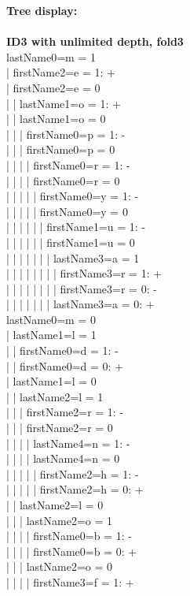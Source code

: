 \begin{enumerate}
		\textbf{Tree display:}\\\\
		\textbf{ID3 with unlimited depth, fold3}\\
lastName0=m = 1\\
|  firstName2=e = 1: +\\
|  firstName2=e = 0\\
|  |  lastName1=o = 1: +\\
|  |  lastName1=o = 0\\
|  |  |  firstName0=p = 1: -\\
|  |  |  firstName0=p = 0\\
|  |  |  |  firstName0=r = 1: -\\
|  |  |  |  firstName0=r = 0\\
|  |  |  |  |  firstName0=y = 1: -\\
|  |  |  |  |  firstName0=y = 0\\
|  |  |  |  |  |  firstName1=u = 1: -\\
|  |  |  |  |  |  firstName1=u = 0\\
|  |  |  |  |  |  |  lastName3=a = 1\\
|  |  |  |  |  |  |  |  firstName3=r = 1: +\\
|  |  |  |  |  |  |  |  firstName3=r = 0: -\\
|  |  |  |  |  |  |  lastName3=a = 0: +\\
lastName0=m = 0\\
|  lastName1=l = 1\\
|  |  firstName0=d = 1: -\\
|  |  firstName0=d = 0: +\\
|  lastName1=l = 0\\
|  |  lastName2=l = 1\\
|  |  |  firstName2=r = 1: -\\
|  |  |  firstName2=r = 0\\
|  |  |  |  lastName4=n = 1: -\\
|  |  |  |  lastName4=n = 0\\
|  |  |  |  |  firstName2=h = 1: -\\
|  |  |  |  |  firstName2=h = 0: +\\
|  |  lastName2=l = 0\\
|  |  |  lastName2=o = 1\\
|  |  |  |  firstName0=b = 1: -\\
|  |  |  |  firstName0=b = 0: +\\
|  |  |  lastName2=o = 0\\
|  |  |  |  firstName3=f = 1: +\\

\end{enumerate}
